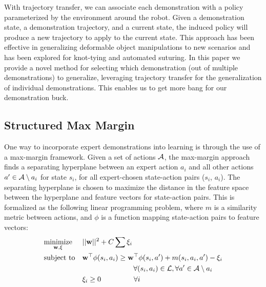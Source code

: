 With trajectory transfer, we can associate each demonstration with a policy parameterized by the environment around the robot.
Given a demonstration state, a demonstration trajectory, and a current state, the induced policy will produce a new trajectory to apply to the current state.
This approach has been effective in generalizing deformable object manipulations to new scenarios and has been explored for knot-tying and automated suturing.
In this paper we provide a novel method for selecting which demonstration (out of multiple demonstrations) to generalize,
leveraging trajectory transfer for the generalization of individual demonstrations.
This enables us to get more bang for our demonstration buck.

\subsection{Structured Max Margin}
One way to incorporate expert demonstrations into learning is through the use of a max-margin framework.
Given a set of actions $\mathcal{A}{}$,
the max-margin approach finds a separating hyperplane between an expert action $a_i$ and all other actions $a' \in \mathcal{A}{}\setminus a_i$ for state $s_i$,
for all expert-chosen state-action pairs ($s_i$, $a_i$).
The separating hyperplane is chosen to maximize the distance in the feature space between the hyperplane and feature vectors for state-action pairs.
This is formalized as the following linear programming problem, where $m$ is a similarity metric between actions, and $\phi$ is a function mapping state-action pairs to feature vectors:
\begin{equation}
\begin{aligned}
& \underset{\mathbf{w}, \xi}{\text{minimize}}  & & ||\mathbf{w}||^2 + C\sum \xi_i\\
& \text{subject to} & &\mathbf{w}^\top \phi(s{}_i, a{}_i) \geq \mathbf{w}^\top \phi(s{}_i, a{}') + m(s{}_i, a{}_i, a{}') - \xi_i 
\\&&&\hspace{2.5cm}\forall (s{}_i, a{}_i) \in \mathcal{L}{}, \forall a{}' \in \mathcal{A}{}\setminus a{}_i \\
& & &\xi_i \geq 0 \hspace{1.6cm} \forall i
\end{aligned}
\end{equation}

